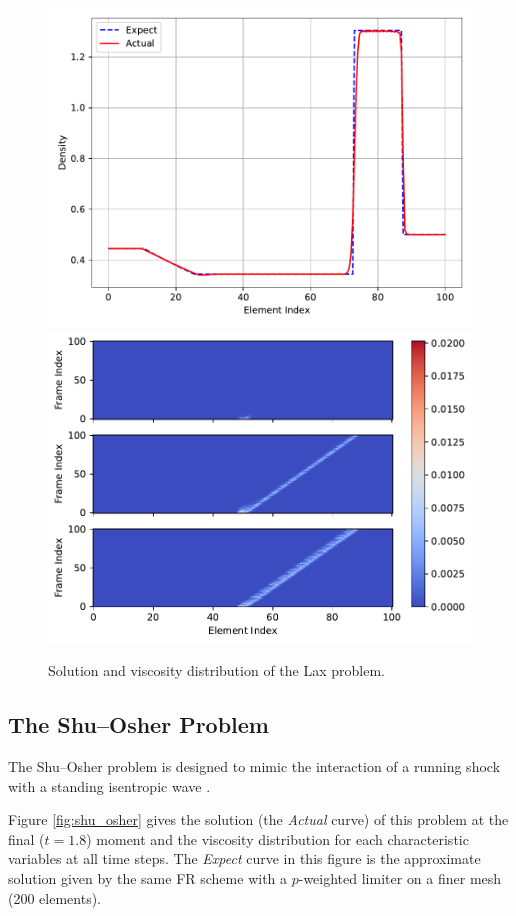 \documentclass[10pt]{article}
\newcommand{\ignore}[1]{}
\begin{document}
{\begin{figure}[H]
  \centering
  \includegraphics[width=.49\textwidth]{./lax/Frame100.pdf}
  \includegraphics[width=.49\textwidth]{./lax/Viscosity.pdf}
  \caption{Solution and viscosity distribution of the Lax problem.}
  \label{fig:lax}
\end{figure}

\subsection{The Shu--Osher Problem}\label{sec:shu_osher}
}
The Shu--Osher problem is designed to mimic the interaction of a running shock with a standing isentropic wave \cite{Shu_1989}.
\ignore{
The computational domain is $x\in[0, 10]$ with two no-reflection conditions applied at the left and right boundaries.
The time range of interest is $t\in[0, 1.8]$ with the initial condition set to be
\begin{equation}
\mqty[\rho & u & p]_{t=0}
=
\begin{cases}
\mqty[3.857143 & 2.629369 & 10.33333], &x\in[0,1);\\
\mqty[1+0.2\sin(5x) & 0 & 1], &x\in(1,10].
\end{cases}
\end{equation}
}
Figure \ref{fig:shu_osher} gives the solution (the \emph{Actual} curve) of this problem at the final ($t=1.8$) moment and the viscosity distribution for each characteristic variables at all time steps.
The \emph{Expect} curve in this figure is the approximate solution given by the same FR scheme with a $p$-weighted limiter \cite{Li_2020} on a finer mesh (200 elements).
\end{document}
